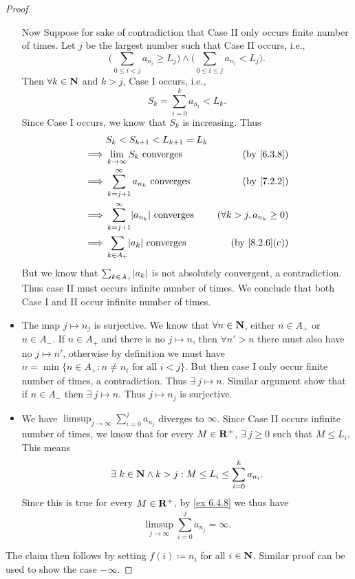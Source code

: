 \begin{proof}
\begin{itemize}
          Now Suppose for sake of contradiction that Case II only occurs finite number of times.
          Let \(j\) be the largest number such that Case II occurs, i.e.,
          \[
            \Bigg(\sum_{0 \leq i < j} a_{n_i} \geq L_j\Bigg) \land \Bigg(\sum_{0 \leq i \leq j} a_{n_i} < L_j\Bigg).
          \]
          Then \(\forall k \in \mathbf{N}\) and \(k > j\), Case I occurs, i.e.,
          \[
            S_k = \sum_{i = 0}^k a_{n_i} < L_k.
          \]
          Since Case I occurs, we know that \(S_k\) is increasing.
          Thus
          \begin{align*}
                     & S_k < S_{k + 1} < L_{k + 1} = L_k                                                         \\
            \implies & \lim_{k \to \infty} S_k \text{ converges}               & \text{(by \cref{6.3.8})}        \\
            \implies & \sum_{k = j + 1}^\infty a_{n_k} \text{ converges}       & \text{(by \cref{7.2.2})}        \\
            \implies & \sum_{k = j + 1}^\infty \abs{a_{n_k}} \text{ converges} & (\forall k > j, a_{n_k} \geq 0) \\
            \implies & \sum_{k \in A_+} \abs{a_k} \text{ converges}            & \text{(by \cref{8.2.6}(c))}
          \end{align*}
          But we know that \(\sum_{k \in A_+} \abs{a_k}\) is not absolutely convergent, a contradiction.
          Thus case II must occurs infinite number of times.
          We conclude that both Case I and II occur infinite number of times.
    \item The map \(j \mapsto n_j\) is surjective.
          We know that \(\forall n \in \mathbf{N}\), either \(n \in A_+\) or \(n \in A_-\).
          If \(n \in A_+\) and there is no \(j \mapsto n\), then \(\forall n' > n\) there must also have no \(j \mapsto n'\), otherwise by definition we must have \(n = \min\{n \in A_+ : n \neq n_i \text{ for all } i < j\}\).
          But then case I only occur finite number of times, a contradiction.
          Thus \(\exists\ j \mapsto n\).
          Similar argument show that if \(n \in A_-\) then \(\exists\ j \mapsto n\).
          Thus \(j \mapsto n_j\) is surjective.
    \item We have \(\limsup_{j \to \infty} \sum_{i = 0}^j a_{n_j}\) diverges to \(\infty\).
          Since Case II occurs infinite number of times, we know that for every \(M \in \mathbf{R}^+\), \(\exists\ j \geq 0\) such that \(M \leq L_i\).
          This means
          \[
            \exists\ k \in \mathbf{N} \land k > j : M \leq L_i \leq \sum_{i = 0}^k a_{n_i}.
          \]
          Since this is true for every \(M \in \mathbf{R}^+\), by \cref{ex 6.4.8} we thus have
          \[
            \limsup_{j \to \infty} \sum_{i = 0}^j a_{n_j} = \infty.
          \]
  \end{itemize}
  The claim then follows by setting \(f(i) \coloneqq n_i\) for all \(i \in \mathbf{N}\).
  Similar proof can be used to show the case \(-\infty\).
\end{proof}